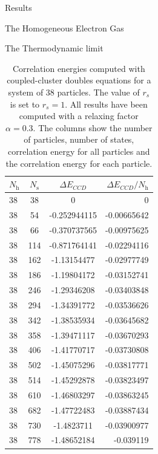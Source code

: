\documentclass[twoside,english]{uiofysmaster}
\begin{document}
\begin{chapter}{Results}
\begin{section}{The Homogeneous Electron Gas}
\begin{subsection}{The Thermodynamic limit}
			\begin{table}[H]
				\begin{center}
					\begin{tabular}[center]{l c  c r}
						$N_{\text{h}}$ & $N_{\text{s}}$ & $\Delta E_{CCD}$ & $\Delta E_{CCD}/N_{\text{h}}$ \\
						\hline
						38 &  38 & 0 &0 \\
						38 &  54 & -0.252944115 & -0.00665642\\
						38 &  66 & -0.370737565 & -0.00975625\\
						38 & 114 & -0.871764141 & -0.02294116\\
						38 & 162 & -1.13154477  & -0.02977749\\
						38 & 186 & -1.19804172  & -0.03152741\\
						38 & 246 & -1.29346208  & -0.03403848\\
						38 & 294 & -1.34391772  & -0.03536626\\
						38 & 342 & -1.38535934  & -0.03645682\\
						38 & 358 & -1.39471117  & -0.03670293\\
						38 & 406 & -1.41770717  & -0.03730808\\
						38 & 502 & -1.45075296  & -0.03817771\\
						38 & 514 & -1.45292878  & -0.03823497\\
						38 & 610 & -1.46803297  & -0.03863245\\
						38 & 682 & -1.47722483  & -0.03887434 \\
						38 & 730 & -1.4823711   & -0.03900977\\
						38 & 778 & -1.48652184  & -0.039119
					\end{tabular}
				\end{center}
				\caption{Correlation energies computed with coupled-cluster doubles equations for a system of $38$ particles. The value of $r_s$ is set to $r_s=1$. All results have been computed with a relaxing factor $\alpha=0.3$. The columns show the number of particles, number of states, correlation energy for all particles and the correlation energy for each particle.}
				\label{table:ThermodynamicLimit2}
			\end{table}


\end{subsection}
\end{section}
\end{chapter}
\end{document}
